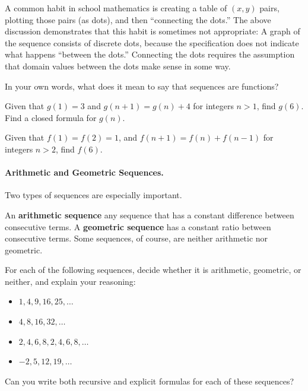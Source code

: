 A common habit in school mathematics is creating a table of $(x,y)$ pairs, plotting those pairs (as dots), and then ``connecting the dots.''  The above discussion demonstrates that this habit is sometimes not appropriate: A graph 
of the sequence consists of discrete dots, because the specification does not indicate what happens ``between the dots.''  Connecting the dots requires the assumption that domain values between the dots make sense in some way.  


\begin{question}
In your own words, what does it mean to say that sequences are functions?
\end{question}
\QM

\begin{question}
Given that $g(1) = 3$ and $g(n+1) = g(n) +4$ for integers $n>1$, find $g(6)$.  
Find a closed formula for $g(n)$.  
\end{question}
\QM

\begin{question}
Given that $f(1) = f(2) = 1$, and $f(n+1) = f(n)+f(n-1)$ for integers $n>2$, find $f(6)$.  
\end{question}
\QM

\paragraph{Arithmetic and Geometric Sequences.}Two types of sequences are especially important.  
\begin{definition}
An \textbf{arithmetic sequence} any sequence that has a constant difference between consecutive terms.  A \textbf{geometric sequence} has a constant ratio between consecutive terms.  Some sequences, of course, are neither arithmetic nor geometric.
\end{definition}
\begin{question}
For each of the following sequences, decide whether it is arithmetic, geometric, or neither, and explain your reasoning:
\begin{itemize}  
\item $1, 4, 9, 16, 25, \dots$
\item $4, 8, 16, 32, \dots$
\item $2, 4, 6, 8, 2, 4, 6, 8, \dots$
\item $-2, 5, 12, 19, \dots$
\end{itemize}
Can you write both recursive and explicit formulas for each of these sequences?  
\end{question}
\QM


